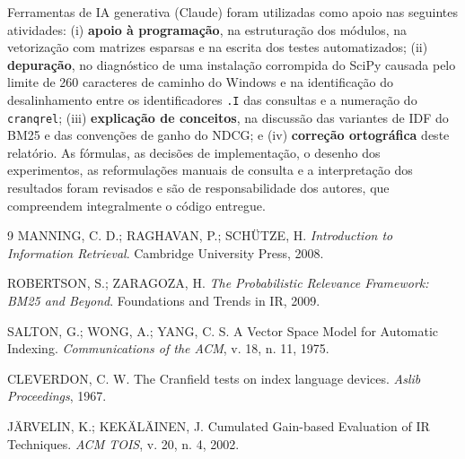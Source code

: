\documentclass[10pt,twocolumn,a4paper]{article}
\begin{document}
Ferramentas de IA generativa (Claude) foram utilizadas como apoio nas seguintes
atividades: (i) \textbf{apoio à programação}, na estruturação dos módulos, na
vetorização com matrizes esparsas e na escrita dos testes automatizados; (ii)
\textbf{depuração}, no diagnóstico de uma instalação corrompida do SciPy causada
pelo limite de 260 caracteres de caminho do Windows e na identificação do
desalinhamento entre os identificadores \texttt{.I} das consultas e a numeração
do \texttt{cranqrel}; (iii) \textbf{explicação de conceitos}, na discussão das
variantes de IDF do BM25 e das convenções de ganho do NDCG; e (iv)
\textbf{correção ortográfica} deste relatório. As fórmulas, as decisões de
implementação, o desenho dos experimentos, as reformulações manuais de consulta e
a interpretação dos resultados foram revisados e são de responsabilidade dos
autores, que compreendem integralmente o código entregue.

\begin{thebibliography}{9}
\footnotesize
{}
MANNING, C. D.; RAGHAVAN, P.; SCHÜTZE, H.
\textit{Introduction to Information Retrieval}.
Cambridge University Press, 2008.

ROBERTSON, S.; ZARAGOZA, H.
\textit{The Probabilistic Relevance Framework: BM25 and Beyond}.
Foundations and Trends in IR, 2009.

SALTON, G.; WONG, A.; YANG, C. S.
A Vector Space Model for Automatic Indexing.
\textit{Communications of the ACM}, v. 18, n. 11, 1975.

CLEVERDON, C. W.
The Cranfield tests on index language devices.
\textit{Aslib Proceedings}, 1967.

JÄRVELIN, K.; KEKÄLÄINEN, J.
Cumulated Gain-based Evaluation of IR Techniques.
\textit{ACM TOIS}, v. 20, n. 4, 2002.
\end{thebibliography}
\end{document}
